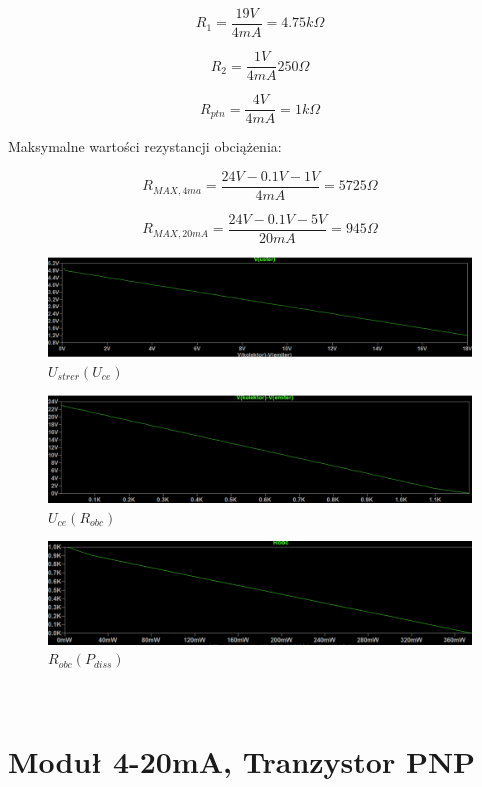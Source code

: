 \documentclass{article}
\begin{document}
$$
    R_{1}=\frac{19V}{4mA}=4.75k\Omega
$$

$$
    R_{2}=\frac{1V}{4mA}250\Omega
$$

$$
    R_{ptn}=\frac{4V}{4mA}=1k\Omega
$$

Maksymalne wartości rezystancji obciążenia:

$$
    R_{MAX, 4ma}=\frac{24V-0.1V-1V}{4mA}=5725\Omega
$$

$$
    R_{MAX, 20mA}=\frac{24V-0.1V-5V}{20mA}=945\Omega
$$


\begin{figure}[h!]
    \includegraphics[scale=0.3]{p7.png}
    \centering
    \caption{$U_{strer}(U_{ce})$}
\end{figure}

\begin{figure}[h!]
    \includegraphics[scale=0.3]{p8.png}
    \centering
    \caption{$U_{ce}(R_{obc})$}
\end{figure}

\begin{figure}[h!]
    \includegraphics[scale=0.3]{p9.png}
    \centering
    \caption{$R_{obc}(P_{diss})$}
\end{figure}

\clearpage
\mbox{~}

\section{Moduł 4-20mA, Tranzystor PNP}
\end{document}
